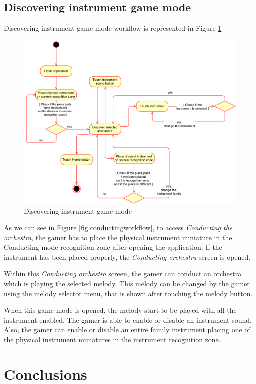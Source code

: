 \FloatBarrier

\newpage
\subsection{Discovering instrument game mode}
\label{subsec:discoverinstrument_arch}

Discovering instrument game mode workflow is represented in Figure \ref{fig:discoveringworkflow}

\begin{figure}[ht!]
	\centering
	\includegraphics[width=400pt]{graphics/DiscoveringGameMode.pdf}
	\caption{Discovering instrument game mode}
	\label{fig:discoveringworkflow}
\end{figure}

As we can see in Figure \ref{fig:conductingworkflow}, to access \textit{Conducting the orchestra}, the gamer has to place the physical instrument miniature in the Conducting mode recognition zone after opening the application. If the instrument has been placed properly, the \textit{Conducting orchestra} screen is opened.

Within this \textit{Conducting orchestra} screen, the gamer can conduct an orchestra which is playing the selected melody. This melody can be changed by the gamer using the melody selector menu, that is shown after touching the melody button.

When this game mode is opened, the melody start to be played with all the instrument enabled. The gamer is able to enable or disable an instrument sound. Also, the gamer can enable or disable an entire family instrument placing one of the physical instrument miniatures in the instrument recognition zone.

\FloatBarrier

\section{Conclusions}
